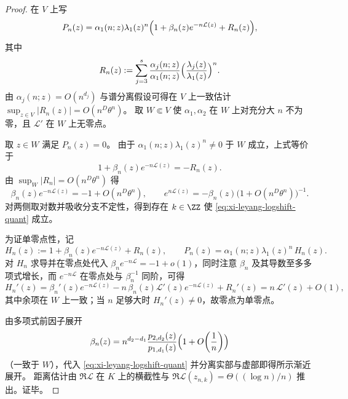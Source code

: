 \begin{proof}
在 \(V\) 上写
\[
P_n(z)=\alpha_1(n;z)\lambda_1(z)^n\Bigl(1+\beta_n(z)e^{-n\mathcal{L}(z)}+R_n(z)\Bigr),
\]
其中
\[
R_n(z):=\sum_{j=3}^{s}\frac{\alpha_j(n;z)}{\alpha_1(n;z)}\Bigl(\frac{\lambda_j(z)}{\lambda_1(z)}\Bigr)^n.
\]
由 \(\alpha_j(n;z)=O(n^{d_j})\) 与谱分离假设可得在 \(V\) 上一致估计
\(
\sup_{z\in V}|R_n(z)|=O(n^{D}\theta^n)
\)。
取 \(W\Subset V\) 使 \(\alpha_1,\alpha_2\) 在 \(W\) 上对充分大 \(n\) 不为零，且 \(\mathcal{L}'\) 在 \(W\) 上无零点。
\par
取 \(z\in W\) 满足 \(P_n(z)=0\)。
由于 \(\alpha_1(n;z)\lambda_1(z)^n\neq 0\) 于 \(W\) 成立，上式等价于
\[
1+\beta_n(z)e^{-n\mathcal{L}(z)}=-R_n(z).
\]
由 \(\sup_W|R_n|=O(n^{D}\theta^n)\) 得
\[
\beta_n(z)e^{-n\mathcal{L}(z)}=-1+O(n^{D}\theta^n),
\qquad
e^{n\mathcal{L}(z)}=-\beta_n(z)\bigl(1+O(n^{D}\theta^n)\bigr)^{-1}.
\]
对两侧取对数并吸收分支不定性，得到存在 \(k\in\ZZ\) 使 \eqref{eq:xi-leyang-logshift-quant} 成立。
\par
为证单零点性，记
\[
H_n(z):=1+\beta_n(z)e^{-n\mathcal{L}(z)}+R_n(z),
\qquad
P_n(z)=\alpha_1(n;z)\lambda_1(z)^n\,H_n(z).
\]
对 \(H_n\) 求导并在零点处代入 \(\beta_n e^{-n\mathcal{L}}=-1+o(1)\)，同时注意 \(\beta_n\) 及其导数至多多项式增长，而 \(e^{-n\mathcal{L}}\) 在零点处与 \(\beta_n^{-1}\) 同阶，可得
\[
H_n'(z)=\beta_n'(z)e^{-n\mathcal{L}(z)}-n\,\beta_n(z)\mathcal{L}'(z)e^{-n\mathcal{L}(z)}+R_n'(z)
=n\,\mathcal{L}'(z)+O(1),
\]
其中余项在 \(W\) 上一致；当 \(n\) 足够大时 \(H_n'(z)\neq 0\)，故零点为单零点。
\par
由多项式前因子展开
\[
\beta_n(z)=n^{d_2-d_1}\frac{p_{2,d_2}(z)}{p_{1,d_1}(z)}\Bigl(1+O\!\left(\frac1n\right)\Bigr)
\]
（一致于 \(W\)），代入 \eqref{eq:xi-leyang-logshift-quant} 并分离实部与虚部即得所示渐近展开。
距离估计由 \(\Re\mathcal{L}\) 在 \(K\) 上的横截性与 \(\Re\mathcal{L}(z_{n,k})=\Theta((\log n)/n)\) 推出。证毕。
\end{proof}

